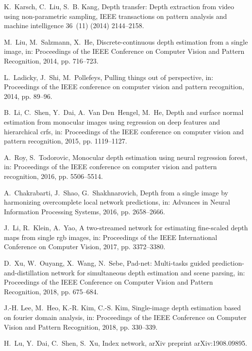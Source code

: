 \documentclass[5p]{elsarticle}
\begin{document}
\begin{thebibliography}{100}
K.~Karsch, C.~Liu, S.~B. Kang, Depth transfer: Depth extraction from video
  using non-parametric sampling, IEEE transactions on pattern analysis and
  machine intelligence 36~(11) (2014) 2144--2158.

M.~Liu, M.~Salzmann, X.~He, Discrete-continuous depth estimation from a single
  image, in: Proceedings of the IEEE Conference on Computer Vision and Pattern
  Recognition, 2014, pp. 716--723.

L.~Ladicky, J.~Shi, M.~Pollefeys, Pulling things out of perspective, in:
  Proceedings of the IEEE conference on computer vision and pattern
  recognition, 2014, pp. 89--96.

B.~Li, C.~Shen, Y.~Dai, A.~Van Den~Hengel, M.~He, Depth and surface normal
  estimation from monocular images using regression on deep features and
  hierarchical crfs, in: Proceedings of the IEEE conference on computer vision
  and pattern recognition, 2015, pp. 1119--1127.

A.~Roy, S.~Todorovic, Monocular depth estimation using neural regression
  forest, in: Proceedings of the IEEE conference on computer vision and pattern
  recognition, 2016, pp. 5506--5514.

A.~Chakrabarti, J.~Shao, G.~Shakhnarovich, Depth from a single image by
  harmonizing overcomplete local network predictions, in: Advances in Neural
  Information Processing Systems, 2016, pp. 2658--2666.

J.~Li, R.~Klein, A.~Yao, A two-streamed network for estimating fine-scaled
  depth maps from single rgb images, in: Proceedings of the IEEE International
  Conference on Computer Vision, 2017, pp. 3372--3380.

D.~Xu, W.~Ouyang, X.~Wang, N.~Sebe, Pad-net: Multi-tasks guided
  prediction-and-distillation network for simultaneous depth estimation and
  scene parsing, in: Proceedings of the IEEE Conference on Computer Vision and
  Pattern Recognition, 2018, pp. 675--684.

J.-H. Lee, M.~Heo, K.-R. Kim, C.-S. Kim, Single-image depth estimation based on
  fourier domain analysis, in: Proceedings of the IEEE Conference on Computer
  Vision and Pattern Recognition, 2018, pp. 330--339.

H.~Lu, Y.~Dai, C.~Shen, S.~Xu, Index network, arXiv preprint arXiv:1908.09895.


\end{thebibliography}
\end{document}
